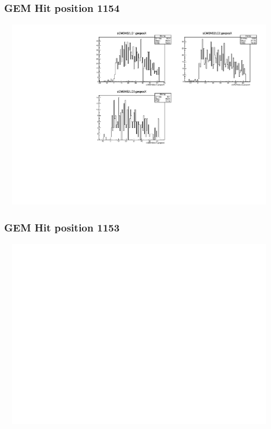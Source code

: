 \documentclass[slidestop,compress,mathserif]{beamer}
\begin{document}
\begin{frame}\frametitle{GEM Hit position 1154}
	 \includegraphics[width=12cm,height=8cm]{GEM_Hit_position_1154.pdf}
\end{frame}
\begin{frame}\frametitle{GEM Hit position 1153}
	 \includegraphics[width=12cm,height=8cm]{GEM_Hit_position_1153.pdf}
\end{frame}
\end{document}
